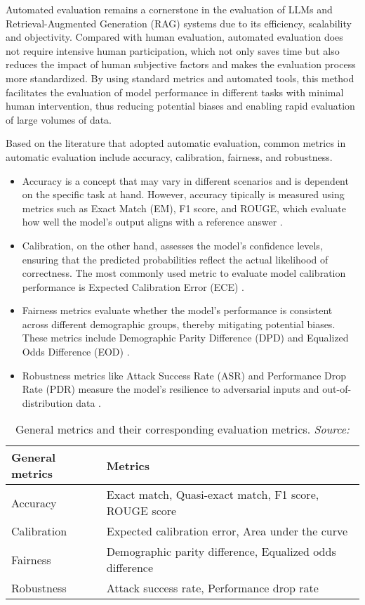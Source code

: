 Automated evaluation remains a cornerstone in the evaluation of LLMs and Retrieval-Augmented Generation (RAG) systems due to its efficiency, scalability and objectivity. Compared with human evaluation, automated evaluation does not require intensive human participation, which not only saves time but also reduces the impact of human subjective factors and makes the evaluation process more standardized. By using standard metrics and automated tools, this method facilitates the evaluation of model performance in different tasks with minimal human intervention, thus reducing potential biases and enabling rapid evaluation of large volumes of data.

Based on the literature that adopted automatic evaluation, common metrics in automatic evaluation include accuracy, calibration, fairness, and robustness.

\begin{itemize}
    \item Accuracy is a concept that may vary in different scenarios and is dependent on the specific task at hand. However, accuracy tipically is measured using metrics such as Exact Match (EM), F1 score, and ROUGE, which evaluate how well the model's output aligns with a reference answer \cite{chang2024survey}.
    \item Calibration, on the other hand, assesses the model’s confidence levels, ensuring that the predicted probabilities reflect the actual likelihood of correctness. The most commonly used metric to evaluate model calibration performance is Expected Calibration Error (ECE) \cite{guo2017calibration}.
    \item Fairness metrics evaluate whether the model's performance is consistent across different demographic groups, thereby mitigating potential biases. These metrics include Demographic Parity Difference (DPD) and Equalized Odds Difference (EOD) \cite{wang2023decodingtrust}.
    \item Robustness metrics like Attack Success Rate (ASR) and Performance Drop Rate (PDR) measure the model's resilience to adversarial inputs and out-of-distribution data \cite{zhu2023promptbench}.
\end{itemize}

\begin{table}[h!]
\centering
\begin{tabular}{|l|l|}
\hline
\textbf{General metrics} & \textbf{Metrics} \\ \hline
Accuracy & Exact match, Quasi-exact match, F1 score, ROUGE score \\ \hline
Calibration & Expected calibration error, Area under the curve \\ \hline
Fairness & Demographic parity difference, Equalized odds difference \\ \hline
Robustness & Attack success rate, Performance drop rate \\ \hline
\end{tabular}
\caption{General metrics and their corresponding evaluation metrics. \textit{Source:} \cite{chang2024survey}}
\end{table}

